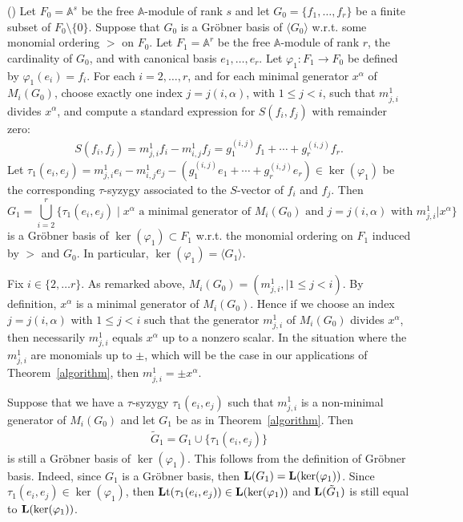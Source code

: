 \documentclass[ALCO]{cedram}
\newcommand{\mba}{\mbox{$\mathbb{A}$}}
\newcommand{\lmod}{\mbox{${\bf L}$}}
\newcommand{\lt}{\mbox{${\bf L}{\rm t}$}}
\begin{document}
\begin{theorem}\label{algorithm} {\rm (\cite[Proposition~3.5]{emss})}
Let $F_0=\mba^s$ be the free $\mba$-module of rank $s$ and let
$G_0=\{f_1,\ldots ,f_r\}$ be a finite subset of
$F_0\setminus\{0\}$. Suppose that $G_0$ is a Gr\"obner basis of
$\langle G_0\rangle$ w.r.t. some monomial ordering $>$ on $F_0$. Let
$F_1=\mba^r$ be the free $\mba$-module of rank $r$, the cardinality of
$G_0$, and with canonical basis $e_1,\ldots ,e_r$. Let
$\varphi_1:F_1\rightarrow F_0$ be defined by $\varphi_1(e_i)=f_i$. For
each $i=2,\ldots ,r$, and for each minimal generator $x^{\alpha}$ of
$M_i(G_0)$, choose exactly one index $j=j(i,\alpha)$, with $1\leq
j<i$, such that $m^1_{j,i}$ divides $x^\alpha$, and compute a standard
expression for $S(f_i,f_j)$ with remainder zero:
\begin{eqnarray*}
S(f_i,f_j)=m^1_{j,i}f_i-m^1_{i,j}f_j=g_1^{(i,j)}f_1+\cdots
+g_r^{(i,j)}f_r.
\end{eqnarray*}
Let $\tau_1(e_i,e_j)=m^1_{j,i}e_i-m^1_{i,j}e_j-(g_1^{(i,j)}e_1+\cdots
+g_r^{(i,j)}e_r)\in \ker(\varphi_1)$ be the corresponding
$\tau$-syzygy associated to the $S$-vector of $f_i$ and $f_j$. Then
\begin{equation*}
G_1=\bigcup_{i=2}^{r}\{\tau_1(e_i,e_j)\!\mid\!x^\alpha\text{ a minimal generator of }M_i(G_0)\text{ and }j=j(i,\alpha)\text{ with }
m^1_{j,i}\vert x^\alpha\}
\end{equation*}
is a Gr\"obner basis of $\ker(\varphi_1)\subset F_1$ w.r.t. the
monomial ordering on $F_1$ induced by $>$ and $G_0$. In particular,
$\ker(\varphi_1)=\langle G_1\rangle$.
\end{theorem}

\begin{remark}\label{uptosign} 
Fix $i\in \{2,\ldots r\}$. As remarked above,
$M_i(G_0)=(m^1_{j,i},\mid 1\leq j<i)$. By definition, $x^{\alpha}$ is
a minimal generator of $M_i(G_0)$. Hence if we choose an index
$j=j(i,\alpha)$ with $1\leq j<i$ such that the generator $m^1_{j,i}$
of $M_i(G_0)$ divides $x^{\alpha}$, then necessarily $m^1_{j,i}$
equals $x^\alpha$ up to a nonzero scalar. In the situation where the
$m^1_{j,i}$ are monomials up to $\pm$, which will be the case in our
applications of Theorem~\ref{algorithm}, then $m^1_{j,i}=\pm
x^\alpha$.
\end{remark}

\begin{remark}\label{nonminimal}
Suppose that we have a $\tau$-syzygy $\tau_1(e_i,e_j)$ such that
$m^1_{j,i}$ is a non-minimal generator of $M_i(G_0)$ and let $G_1$ be
as in Theorem~\ref{algorithm}. Then 
\begin{eqnarray*}
\tilde{G}_1=G_1\cup \{\tau_1(e_i,e_j)\}
\end{eqnarray*}
is still a Gr\"obner basis of
$\ker(\varphi_1)$. This follows from the definition of Gr\"obner
basis. Indeed, since $G_1$ is a Gr\"obner basis, then
$\lmod(G_1)=\lmod(\ker(\varphi_1))$. Since
$\tau_1(e_i,e_j)\in\ker(\varphi_1)$, then
$\lt(\tau_1(e_i,e_j))\in\lmod(\ker(\varphi_1))$ and
$\lmod(\tilde{G}_1)$ is still equal to $\lmod(\ker(\varphi_1))$.
\end{remark}
\end{document}
